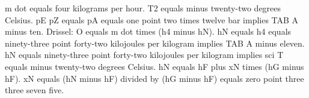 m dot equals four kilograms per hour. T2 equals minus twenty-two degrees Celsius. pE pZ equals pA equals one point two times twelve bar implies TAB A minus ten. Drissel: O equals m dot times (h4 minus hN). hN equals h4 equals ninety-three point forty-two kilojoules per kilogram implies TAB A minus eleven. hN equals ninety-three point forty-two kilojoules per kilogram implies sci T equals minus twenty-two degrees Celsius. hN equals hF plus xN times (hG minus hF). xN equals (hN minus hF) divided by (hG minus hF) equals zero point three three seven five.